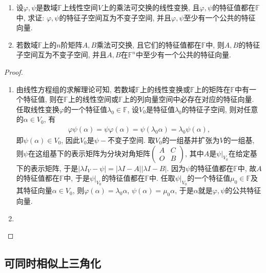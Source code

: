 \documentclass[../../main.tex]{subfiles}
\begin{document}
\begin{proposition}\label{proposition:一般数域上乘法可交换诱导的性质}
\begin{enumerate}
\item 设\(\varphi,\psi\)是数域\(\mathbb{F}\)上线性空间\(V\)上的乘法可交换的线性变换, 且\(\varphi,\psi\)的特征值都在\(\mathbb{F}\)中, 求证: \(\varphi,\psi\)的特征子空间互为不变子空间, 并且\(\varphi,\psi\)至少有一个公共的特征向量.

\item 若数域\(\mathbb{F}\)上的\(n\)阶矩阵\(A,B\)乘法可交换, 且它们的特征值都在\(\mathbb{F}\)中, 则\(A,B\)的特征子空间互为不变子空间, 并且\(A,B\)在\(\mathbb{F}^n\)中至少有一个公共的特征向量.
\end{enumerate}
\end{proposition}
\begin{proof}
\begin{enumerate}
\item 由线性方程组的求解理论可知, 若数域\(\mathbb{F}\)上的线性变换或\(\mathbb{F}\)上的矩阵在\(\mathbb{F}\)中有一个特征值, 则在\(\mathbb{F}\)上的线性空间或\(\mathbb{F}\)上的列向量空间中必存在对应的特征向量. 任取线性变换\(\varphi\)的一个特征值\(\lambda_{0} \in \mathbb{F}\), 设\(V_{0}\)是特征值\(\lambda_{0}\)的特征子空间, 则对任意的\(\alpha \in V_{0}\), 有
\begin{align*}
\varphi\psi(\alpha)=\psi\varphi(\alpha)=\psi(\lambda_{0}\alpha)=\lambda_{0}\psi(\alpha),
\end{align*}
即\(\psi(\alpha) \in V_{0}\), 因此\(V_{0}\)是\(\psi -\)不变子空间. 取\(V_{0}\)的一组基并扩张为\(V\)的一组基, 则\(\psi\)在这组基下的表示矩阵为分块对角矩阵\(\begin{pmatrix}
A&C\\
O&B
\end{pmatrix}\), 其中\(A\)是\(\psi|_{V_{0}}\)在给定基下的表示矩阵, 于是\(|\lambda I_{V}-\psi| = |\lambda I - A||\lambda I - B|\). 因为\(\psi\)的特征值都在\(\mathbb{F}\)中, 故\(A\)的特征值都在\(\mathbb{F}\)中, 于是\(\psi|_{V_{0}}\)的特征值都在\(\mathbb{F}\)中. 任取\(\psi|_{V_{0}}\)的一个特征值\(\mu_{0} \in \mathbb{F}\)及其特征向量\(\alpha \in V_{0}\), 则\(\varphi(\alpha)=\lambda_{0}\alpha\), \(\psi(\alpha)=\mu_{0}\alpha\), 于是\(\alpha\)就是\(\varphi,\psi\)的公共特征向量. 

\item 
\end{enumerate}
\end{proof}



\subsection{可同时相似上三角化}
\end{document}
